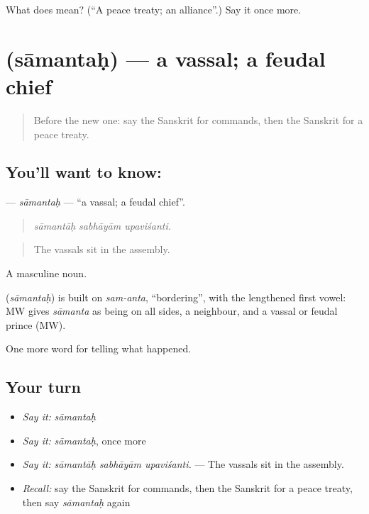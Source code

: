 \begin{tcolorbox}[breakable,colback=teal!4,colframe=teal!35!black,title={Before you move on}]
What does  mean? (\textquotedblleft{}A peace treaty; an alliance\textquotedblright{}.) Say it once more.
\end{tcolorbox}
\section[\texorpdfstring{\sk{सामन्तः} (sāmantaḥ)}{सामन्तः (sāmantaḥ)}]{ (sāmantaḥ) — a vassal; a feudal chief}

\label{lesson:SA-C317-samantah}



\begin{quote}
Before the new one: say the Sanskrit for commands, then the Sanskrit for a peace treaty.
\end{quote}

\subsection*{You'll want to know: }
\textbf{} — \emph{sāmantaḥ} — \textquotedblleft{}a vassal; a feudal chief\textquotedblright{}.

\begin{quote}
  
\end{quote}

\begin{quote}
\emph{sāmantāḥ sabhāyām upaviśanti.}
\end{quote}

\begin{quote}
The vassals sit in the assembly.
\end{quote}

A masculine noun.

\begin{cousinweb}
\textbf{} (\emph{sāmantaḥ}) is built on \emph{sam-anta}, \textquotedblleft{}bordering\textquotedblright{}, with the lengthened first vowel: MW gives \emph{sāmanta} as being on all sides, a neighbour, and a vassal or feudal prince (MW).
\end{cousinweb}

\begin{grammarlens}[title={What you've built}]
One more word for telling what happened.
\end{grammarlens}

\subsection*{Your turn}
\begin{itemize}
\raggedright
  \item \emph{Say it:} \emph{sāmantaḥ}
  \item \emph{Say it:} \emph{sāmantaḥ}, once more
  \item \emph{Say it:} \emph{sāmantāḥ sabhāyām upaviśanti.} — The vassals sit in the assembly.
  \item \emph{Recall:} say the Sanskrit for commands, then the Sanskrit for a peace treaty, then say \emph{sāmantaḥ} again
\end{itemize}

